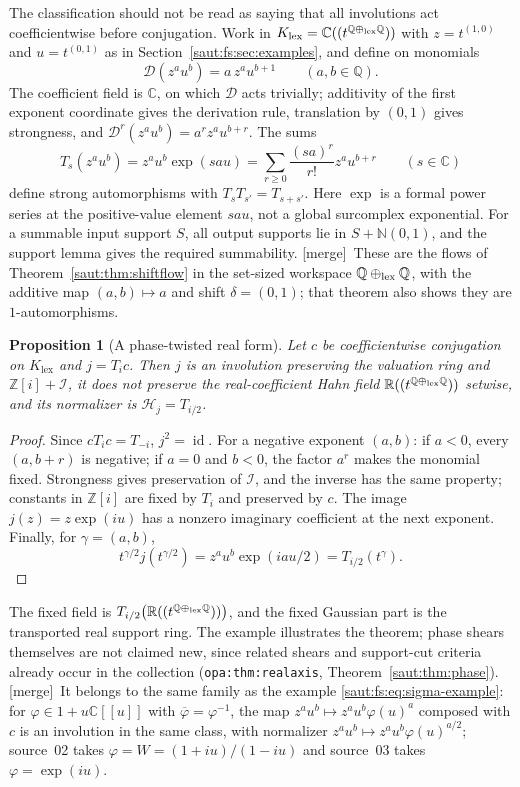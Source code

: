 \documentclass[11pt]{article}
\newtheorem{proposition}[theorem]{Proposition}
\theoremstyle{definition}
\theoremstyle{remark}
\newcommand{\R}{\mathbb R}
\newcommand{\C}{\mathbb C}
\newcommand{\Q}{\mathbb Q}
\newcommand{\N}{\mathbb N}
\newcommand{\Z}{\mathbb Z}
\newcommand{\id}{\operatorname{id}}
\newcommand{\lbl}[1]{\nolinkurl{#1}}%
\newcommand{\Ineg}{\mathcal I}
\newcommand{\mergetag}{\textup{[merge]}}
\numberwithin{equation}{section}
\begin{document}
The classification should not be read as saying that all involutions act
coefficientwise before conjugation. Work in
$K_{\mathrm{lex}}=\C((t^{\Q\oplus_{\rm lex}\Q}))$ with $z=t^{(1,0)}$ and $u=t^{(0,1)}$ as in
Section~\ref{saut:fs:sec:examples}, and define on monomials
\begin{equation}\label{saut:gr:eq:D}
 \mathcal D(z^au^b)=a\,z^au^{b+1}\qquad(a,b\in\Q).
\end{equation}
The coefficient field is $\C$, on which $\mathcal D$ acts trivially; additivity of the
first exponent coordinate gives the derivation rule, translation by $(0,1)$ gives
strongness, and $\mathcal D^r(z^au^b)=a^rz^au^{b+r}$. The sums
\begin{equation}\label{saut:gr:eq:flow}
 T_s(z^au^b)=z^au^b\exp(sau)=\sum_{r\ge0}\frac{(sa)^r}{r!}z^au^{b+r}\qquad(s\in\C)
\end{equation}
define strong automorphisms with $T_sT_{s'}=T_{s+s'}$. Here $\exp$ is a formal power
series at the positive-value element $sau$, not a global surcomplex exponential. For a
summable input support $S$, all output supports lie in $S+\N(0,1)$, and the support
lemma gives the required summability. \mergetag\ These are the flows of
Theorem~\ref{saut:thm:shiftflow} in the set-sized workspace $\Q\oplus_{\rm lex}\Q$, with
the additive map $(a,b)\mapsto a$ and shift $\delta=(0,1)$; that theorem also shows they
are $1$-automorphisms.

\begin{proposition}[A phase-twisted real form]\label{saut:gr:prop:phase}
Let $c$ be coefficientwise conjugation on $K_{\mathrm{lex}}$ and $j=T_ic$. Then $j$ is an
involution preserving the valuation ring and $\Z[i]+\Ineg$, it does not preserve the
real-coefficient Hahn field $\R((t^{\Q\oplus_{\rm lex}\Q}))$ setwise, and its normalizer is
$\mathcal H_j=T_{i/2}$.
\end{proposition}
\begin{proof}
Since $cT_ic=T_{-i}$, $j^2=\id$. For a negative exponent $(a,b)$: if $a<0$, every
$(a,b+r)$ is negative; if $a=0$ and $b<0$, the factor $a^r$ makes the monomial fixed.
Strongness gives preservation of $\Ineg$, and the inverse has the same property;
constants in $\Z[i]$ are fixed by $T_i$ and preserved by $c$. The image
$j(z)=z\exp(iu)$ has a nonzero imaginary coefficient at the next exponent. Finally, for
$\gamma=(a,b)$,
\[
 t^{\gamma/2}j(t^{\gamma/2})=z^au^b\exp(iau/2)=T_{i/2}(t^\gamma).
\]
\end{proof}

The fixed field is $T_{i/2}\bigl(\R((t^{\Q\oplus_{\rm lex}\Q}))\bigr)$, and the fixed Gaussian
part is the transported real support ring. The example illustrates the theorem; phase
shears themselves are not claimed new, since related shears and support-cut criteria
already occur in the collection (\lbl{opa:thm:realaxis}, Theorem~\ref{saut:thm:phase}).
\mergetag\ It belongs to the same family as the example \eqref{saut:fs:eq:sigma-example}:
for $\varphi\in1+u\C[[u]]$ with $\overline\varphi=\varphi^{-1}$, the map
$z^au^b\mapsto z^au^b\varphi(u)^a$ composed with $c$ is an involution in the same class,
with normalizer $z^au^b\mapsto z^au^b\varphi(u)^{a/2}$; source~02 takes
$\varphi=W=(1+iu)/(1-iu)$ and source~03 takes $\varphi=\exp(iu)$.
\end{document}
